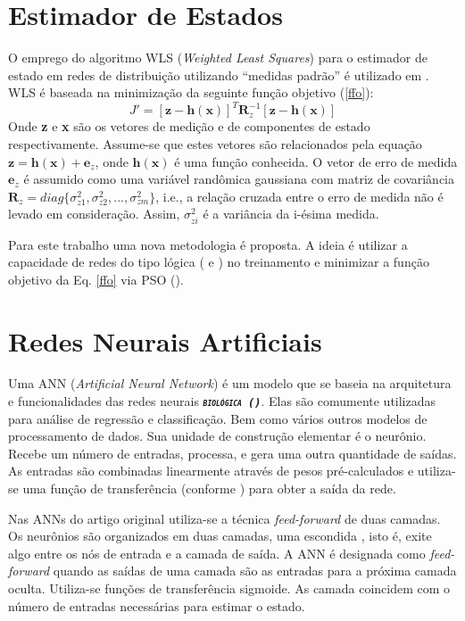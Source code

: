 \documentclass{IEEEtran}
\begin{document}
\section{Estimador de Estados}
O emprego do algoritmo WLS (\textit{Weighted Least Squares}) para o estimador de estado em redes de distribuição utilizando ``medidas padrão'' é utilizado em \cite{singh2009choice}. WLS é baseada na minimização da seguinte função objetivo (\ref{ffo}):
\begin{equation} \label{ffo}
J'=[\textbf{z}-\textbf{h}(\textbf{x})]^T\textbf{R}_z^{-1}[\textbf{z}-\textbf{h}(\textbf{x})]  
\end{equation}
Onde \textbf{z} e \textbf{x} são os vetores de medição e de componentes de estado respectivamente. Assume-se que estes vetores são relacionados pela equação $\textbf{z}=\textbf{h}(\textbf{x})+\textbf{e}_z$, onde $\textbf{h}(\textbf{x})$ é uma função conhecida. O vetor de erro de medida $\textbf{e}_z$ é assumido como uma variável randômica gaussiana com matriz de covariância $\textbf{R}_z=diag\{\sigma^2_{z1},\sigma^2_{z2}, ...,\sigma^2_{zm}\}$, i.e., a relação cruzada entre o erro de medida \cite{caro2009power} não é levado em consideração. Assim, $\sigma^2_{zi}$ é a variância da i-ésima medida.

Para este trabalho uma nova metodologia é proposta. A ideia é utilizar a capacidade de redes do tipo lógica (\cite{pedrycz2006or} e \cite{eu2014RNALogica}) no treinamento e minimizar a função objetivo da Eq. \ref{ffo} via PSO (\cite{del2008particle}).


\section{Redes Neurais Artificiais} \label{rna}
Uma ANN (\textit{Artificial Neural Network}) é um modelo que se baseia na arquitetura e funcionalidades das redes neurais \emph{\textbf{\textit{\textsl{\texttt{\textsc{biológica (\cite{manitsas2012distribution})}}}}}}. Elas são comumente utilizadas para análise de regressão e classificação. Bem como vários outros modelos de processamento de dados. Sua unidade de construção elementar é o neurônio. Recebe um número de entradas, processa, e gera uma outra quantidade de saídas. As entradas são combinadas linearmente através de pesos pré-calculados e utiliza-se uma função de transferência (conforme \cite{hippert2001neural}) para obter a saída da rede.

Nas ANNs do artigo original utiliza-se a técnica \textit{feed-forward} de duas camadas. 
Os neurônios são organizados em duas camadas, uma escondida , isto é, exite algo entre os nós de entrada e a camada de saída. A ANN é designada como \textit{feed-forward} quando as saídas de uma camada são as entradas para a próxima camada oculta. Utiliza-se funções de transferência sigmoide. As camada coincidem com o número de entradas necessárias para estimar o estado.
\end{document}
